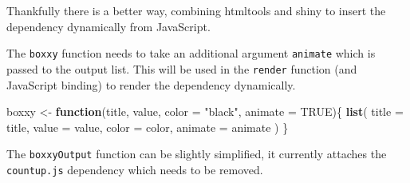 \documentclass[10pt,]{krantz}
\makeatletter
\newenvironment{Shaded}{\begin{snugshade}}{\end{snugshade}}
\newcommand{\CommentTok}[1]{\textcolor[rgb]{0.37,0.37,0.37}{\textit{#1}}}
\newcommand{\ControlFlowTok}[1]{\textcolor[rgb]{0.27,0.27,0.27}{\textbf{#1}}}
\newcommand{\DataTypeTok}[1]{\textcolor[rgb]{0.27,0.27,0.27}{#1}}
\newcommand{\KeywordTok}[1]{\textcolor[rgb]{0.27,0.27,0.27}{\textbf{#1}}}
\newcommand{\NormalTok}[1]{#1}
\newcommand{\OperatorTok}[1]{\textcolor[rgb]{0.43,0.43,0.43}{\textbf{#1}}}
\newcommand{\OtherTok}[1]{\textcolor[rgb]{0.37,0.37,0.37}{#1}}
\newcommand{\StringTok}[1]{\textcolor[rgb]{0.5,0.5,0.5}{#1}}
\newenvironment{kframe}{%
\medskip{}
\setlength{\fboxsep}{.8em}
 \def\at@end@of@kframe{}%
 \ifinner\ifhmode%
  \def\at@end@of@kframe{\end{minipage}}%
  \begin{minipage}{\columnwidth}%
 \fi\fi%
 \def\FrameCommand##1{\hskip\@totalleftmargin \hskip-\fboxsep
 \colorbox{shadecolor}{##1}\hskip-\fboxsep
     \hskip-\linewidth \hskip-\@totalleftmargin \hskip\columnwidth}%
 \MakeFramed {\advance\hsize-\width
   \@totalleftmargin\z@ \linewidth\hsize
   \@setminipage}}%
 {\par\unskip\endMakeFramed%
 \at@end@of@kframe}
\renewenvironment{Shaded}{\begin{kframe}}{\end{kframe}}
\makeatother
\begin{document}
Thankfully there is a better way, combining htmltools and shiny to insert the dependency dynamically from JavaScript.

The \texttt{boxxy} function needs to take an additional argument \texttt{animate} which is passed to the output list. This will be used in the \texttt{render} function (and JavaScript binding) to render the dependency dynamically.

\begin{Shaded}
\begin{Highlighting}[]
\NormalTok{boxxy <-}\StringTok{ }\ControlFlowTok{function}\NormalTok{(title, value, }\DataTypeTok{color =} \StringTok{"black"}\NormalTok{, }\DataTypeTok{animate =} \OtherTok{TRUE}\NormalTok{)\{}
  \KeywordTok{list}\NormalTok{(}
    \DataTypeTok{title =}\NormalTok{ title, }\DataTypeTok{value =}\NormalTok{ value, }\DataTypeTok{color =}\NormalTok{ color, }\DataTypeTok{animate =}\NormalTok{ animate}
\NormalTok{  )}
\NormalTok{\}}
\end{Highlighting}
\end{Shaded}

The \texttt{boxxyOutput} function can be slightly simplified, it currently attaches the \texttt{countup.js} dependency which needs to be removed.

\begin{Shaded}
\end{Shaded}
\end{document}
